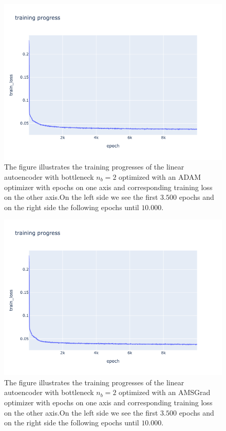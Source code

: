 \begin{figure}
\begin{center}
\includegraphics[width=\linewidth]{linear_AE_2d_adam_training_progress}
\end{center}
\caption{The figure illustrates the training progresses of the linear autoencoder with bottleneck $n_b=2$ optimized with an ADAM optimizer with epochs on one axis and corresponding training loss on the other axis.On the left side we see the first $3.500$ epochs and on the right side the following epochs until $10.000$.}\label{fig:linear_AE_2d_adam_training_progress}
\end{figure}


\begin{figure}
\begin{center}
\includegraphics[width=\linewidth]{linear_AE_2d_amsgrad_training_progress}
\end{center}
\caption{The figure illustrates the training progresses of the linear autoencoder with bottleneck $n_b=2$ optimized with an AMSGrad optimizer with epochs on one axis and corresponding training loss on the other axis.On the left side we see the first $3.500$ epochs and on the right side the following epochs until $10.000$.}\label{fig:linear_AE_2d_amsgrad_training_progress}
\end{figure}


